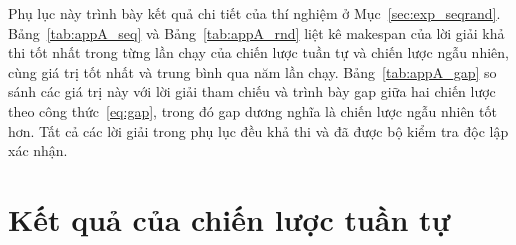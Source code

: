 \documentclass[../DoAn.tex]{subfiles}
\begin{document}

Phụ lục này trình bày kết quả chi tiết của thí nghiệm ở Mục~\ref{sec:exp_seqrand}. Bảng~\ref{tab:appA_seq} và Bảng~\ref{tab:appA_rnd} liệt kê makespan của lời giải khả thi tốt nhất trong từng lần chạy của chiến lược tuần tự và chiến lược ngẫu nhiên, cùng giá trị tốt nhất và trung bình qua năm lần chạy. Bảng~\ref{tab:appA_gap} so sánh các giá trị này với lời giải tham chiếu và trình bày gap giữa hai chiến lược theo công thức~\eqref{eq:gap}, trong đó gap dương nghĩa là chiến lược ngẫu nhiên tốt hơn. Tất cả các lời giải trong phụ lục đều khả thi và đã được bộ kiểm tra độc lập xác nhận.

\section{Kết quả của chiến lược tuần tự}
\end{document}
